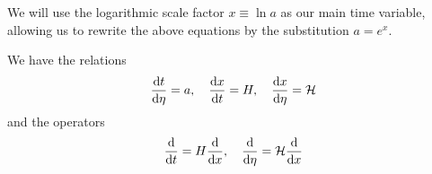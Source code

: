 We will use the logarithmic scale factor $x\equiv\ln{a}$ as our main time variable, allowing us to rewrite the above equations by the substitution $a=e^x$. 

We have the relations
\begin{equation}
    \frac{\mathrm{d} t}{\mathrm{d} \eta} = a, \quad \frac{\mathrm{d} x}{\mathrm{d} t} = H, \quad \frac{\mathrm{d} x}{\mathrm{d} \eta} = \mathcal{H} 
\end{equation}
and the operators
\begin{equation}
    \frac{\mathrm{d}}{\mathrm{d} t} = H \frac{\mathrm{d}}{\mathrm{d} x}, \quad \frac{\mathrm{d}}{\mathrm{d} \eta} = \mathcal{H} \frac{\mathrm{d}}{\mathrm{d} x}
\end{equation}